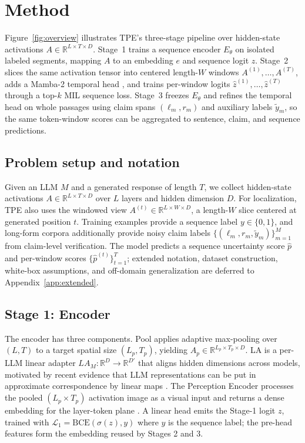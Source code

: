 \section{Method}
\label{sec:model}



Figure~\ref{fig:overview} illustrates TPE's three-stage pipeline over
hidden-state activations $A \in \mathbb{R}^{L \times T \times D}$.
Stage~1 trains a sequence encoder $E_\theta$ on isolated labeled
segments, mapping $A$ to an embedding $e$ and sequence logit $z$.
Stage~2 slices the same activation tensor into centered length-$W$
windows $A^{(1)},\ldots,A^{(T)}$, adds a Mamba-2 temporal head
\citep{albertgu2024}, and trains per-window logits
$\hat{z}^{(1)},\ldots,\hat{z}^{(T)}$ through a top-$k$ MIL sequence
loss. Stage~3 freezes $E_\theta$ and refines the temporal head on
whole passages using claim spans $(\ell_m,r_m)$ and auxiliary labels
$\tilde{y}_m$, so the same token-window scores can be aggregated to
sentence, claim, and sequence predictions.

\subsection{Problem setup and notation}
\label{sec:notation}

Given an LLM $M$ and a generated response of length $T$, we collect
hidden-state activations $A \in \mathbb{R}^{L \times T \times D}$
over $L$ layers and hidden dimension $D$. For localization, TPE also
uses the windowed view
$A^{(t)} \in \mathbb{R}^{L \times W \times D}$, a length-$W$ slice
centered at generated position $t$. Training examples provide a
sequence label $y \in \{0,1\}$, and long-form corpora additionally
provide noisy claim labels
$\{(\ell_m, r_m, \tilde{y}_m)\}_{m=1}^{M}$ from claim-level
verification. The model predicts a sequence uncertainty score
$\hat{p}$ and per-window scores
$\{\hat{p}^{(t)}\}_{t=1}^{T}$; extended notation, dataset
construction, white-box assumptions, and off-domain generalization
are deferred to Appendix~\ref{app:extended}.

\subsection{Stage 1: Encoder}
\label{sec:act_vit_subsec}

The encoder has three components. Pool applies adaptive
max-pooling over $(L, T)$ to a target spatial size $(L_p, T_p)$,
yielding $A_p \in \mathbb{R}^{L_p \times T_p \times D}$. LA
is a per-LLM linear adapter
$LA_M : \mathbb{R}^D \to \mathbb{R}^{D'}$ that aligns hidden
dimensions across models, motivated by recent evidence that LLM
representations can be put in
approximate correspondence by linear maps
\citep{huh2024,moschella2022,kornblith2019}. The Perception Encoder
processes the pooled $(L_p \times T_p)$ activation image as a visual
input and returns a dense embedding for the layer-token plane
\citep{bolya2025perceptionencoder}. A linear head emits the Stage-1
logit $z$, trained with
$\mathcal{L}_{1} = \mathrm{BCE}(\sigma(z), y)$ where $y$ is the
sequence label; the pre-head features form the embedding reused by
Stages 2 and 3.

